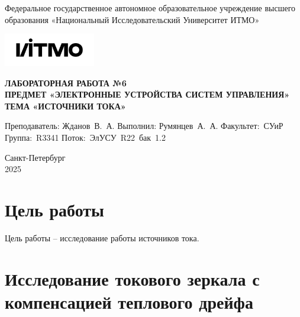 \documentclass[a4paper, 12pt]{article}
\begin{document}
    \begin{titlepage}

        \begin{center}
        Федеральное государственное автономное образовательное учреждение высшего образования
        «Национальный Исследовательский Университет ИТМО»
        \vfill
        
        \includegraphics[width=0.3\textwidth]{itmo.png} %

        {\large\bf ЛАБОРАТОРНАЯ РАБОТА №6}\\
        {\large\bf ПРЕДМЕТ «ЭЛЕКТРОННЫЕ УСТРОЙСТВА СИСТЕМ УПРАВЛЕНИЯ»}\\
        {\large\bf ТЕМА «ИСТОЧНИКИ ТОКА»}
        \vfill

        \begin{flushright}
            \begin{minipage}{.45\textwidth}
            {
                \hbox{Преподаватель:}
                \hbox{Жданов В. А.}
                \hbox{}
                \hbox{Выполнил:}
                \hbox{Румянцев А. А.}
                \hbox{}
                \hbox{Факультет: СУиР}
                \hbox{Группа: R3341}
                \hbox{Поток: ЭлУСУ R22 бак 1.2}
            }
            \end{minipage}
        \end{flushright}
        \vfill
  
        Санкт-Петербург\\
        2025
        \end{center}
    \end{titlepage}
    
    \tableofcontents

    \newpage
    \section{Цель работы}
    Цель работы -- исследование работы источников тока.


    \section{Исследование токового зеркала с компенсацией теплового дрейфа}
\end{document}
